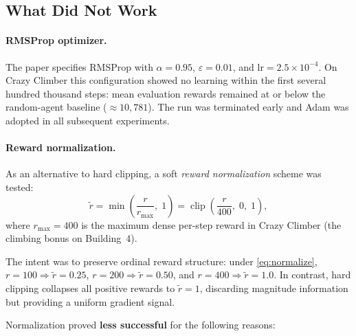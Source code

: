 \documentclass[11pt,a4paper]{article}
\begin{document}
\subsection{What Did Not Work}

\paragraph{RMSProp optimizer.}
The paper specifies RMSProp with $\alpha=0.95$, $\varepsilon=0.01$, and
$\text{lr}=2.5\times10^{-4}$.
On Crazy Climber this configuration showed no learning within the first
several hundred thousand steps: mean evaluation rewards remained at or
below the random-agent baseline (${\approx}10{,}781$).
The run was terminated early and Adam was adopted in all subsequent
experiments.

\paragraph{Reward normalization.}
As an alternative to hard clipping, a soft \emph{reward normalization}
scheme was tested:
\begin{equation}
  \tilde{r} = \min\!\left(\frac{r}{r_{\max}},\;1\right)
            = \operatorname{clip}\!\left(\frac{r}{400},\;0,\;1\right),
  \label{eq:normalize}
\end{equation}
where $r_{\max} = 400$ is the maximum dense per-step reward in Crazy
Climber (the climbing bonus on Building~4).

The intent was to preserve ordinal reward structure: under
\eqref{eq:normalize},
$r=100 \Rightarrow \tilde{r}=0.25$,
$r=200 \Rightarrow \tilde{r}=0.50$, and
$r=400 \Rightarrow \tilde{r}=1.0$.
In contrast, hard clipping collapses all positive rewards to $\tilde{r}=1$,
discarding magnitude information but providing a uniform gradient signal.

Normalization proved \textbf{less successful} for the following reasons:
\end{document}
